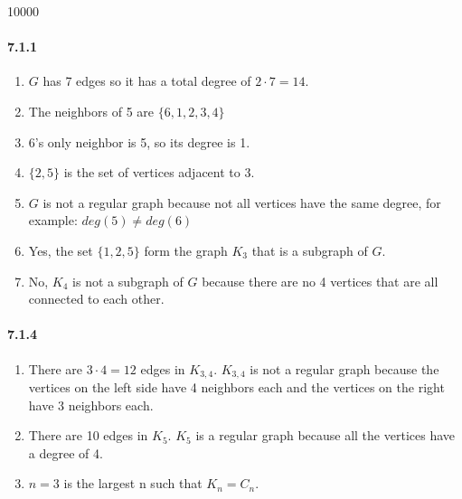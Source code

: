 \documentclass[11pt, letterpaper, twocolumn, fleqn]{article}
\begin{document}
\renewcommand{\labelenumi}{\alph{enumi}.}
\renewcommand{\labelenumii}{(\arabic{enumii})}
\renewcommand{\qedsymbol}{$\blacksquare$}

 10000
\raggedbottom
\pagestyle{headings}

\paragraph{7.1.1}
\begin{enumerate}
  \item $G$ has 7 edges so it has a total degree of $2 \cdot 7 = 14$.
  \item The neighbors of 5 are $\{6,1,2,3,4\}$
  \item 6's only neighbor is 5, so its degree is 1.
  \item $\{2,5\}$ is the set of vertices adjacent to 3.
  \item $G$ is not a regular graph because not all vertices have the same degree, for example: $deg(5) \neq deg(6)$
  \item Yes, the set $\{1,2,5\}$ form the graph $K_3$ that is a subgraph of $G$.
  \item No, $K_4$ is not a subgraph of $G$ because there are no 4 vertices that are all connected to each other.
\end{enumerate}

\paragraph{7.1.4}
\begin{enumerate}
  \item There are $3 \cdot 4 = 12$ edges in $K_{3,4}$. $K_{3,4}$ is not a regular graph because the vertices on the left side have 4 neighbors each and the vertices on the right have 3 neighbors each.
  \item There are 10 edges in $K_5$. $K_5$ is a regular graph because all the vertices have a degree of 4.
  \item $n=3$ is the largest n such that $K_n = C_n$. 
\end{enumerate}
\end{document}

